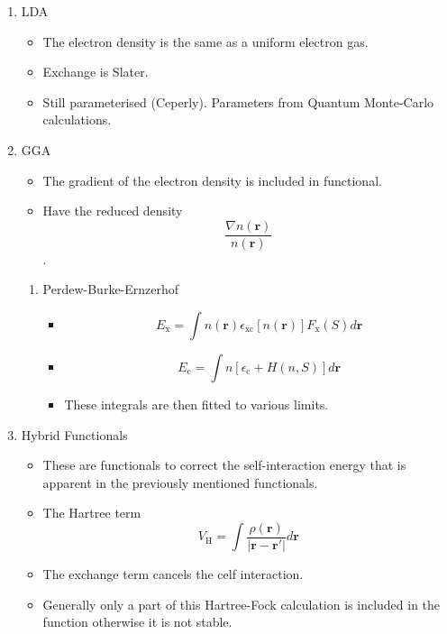 \documentclass[11pt]{article}
\begin{document}
\begin{enumerate}
\item LDA
\label{sec:org6d3f500}
\begin{itemize}
\item The electron density is the same as a uniform electron gas.
\item Exchange is Slater.
\item Still parameterised (Ceperly). Parameters from Quantum Monte-Carlo
calculations.
\end{itemize}

\item GGA
\label{sec:orge9d616e}
\begin{itemize}
\item The gradient of the electron density is included in functional.
\item Have the reduced density \[ \frac{ \nabla n(\mathbf{r})}{n( \mathbf{r}
       )}\].
\end{itemize}
\begin{enumerate}
\item Perdew-Burke-Ernzerhof
\label{sec:org3f532a3}
\begin{itemize}
\item \[ E_{\text{x}} = \int n( \mathbf{r} ) \epsilon_{\text{xc}}[n( \mathbf{r}
        )] F_{\text{x}}(S)d\mathbf{r} \]
\item \[ E_{\text{c}} = \int n[ \epsilon_{\text{c}} + H(n,S) ]d\mathbf{r} \]
\item These integrals are then fitted to various limits.
\end{itemize}
\end{enumerate}

\item Hybrid Functionals
\label{sec:org5527776}
\begin{itemize}
\item These are functionals to correct the self-interaction energy that is
apparent in the previously mentioned functionals.
\item The Hartree term \[V_{\text{H}}=\int \frac{\rho(\mathbf{r})}{|\mathbf{r} - \mathbf{r}'|} d\mathbf{r}  \]
\item The exchange term cancels the celf interaction.
\item Generally only a part of this Hartree-Fock calculation is included in
the function otherwise it is not stable.
\end{itemize}






\end{enumerate}
\end{document}
